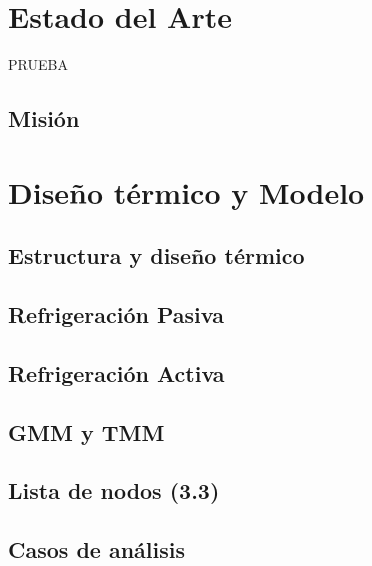 
\section{Estado del Arte}

PRUEBA

\subsection{Misión}

\section{Diseño térmico y Modelo}

\subsection{Estructura y diseño térmico}


\subsection{Refrigeración Pasiva}

\subsection{Refrigeración Activa}

\subsection{GMM y TMM}

\subsection{Lista de nodos (3.3)}

\subsection{Casos de análisis}